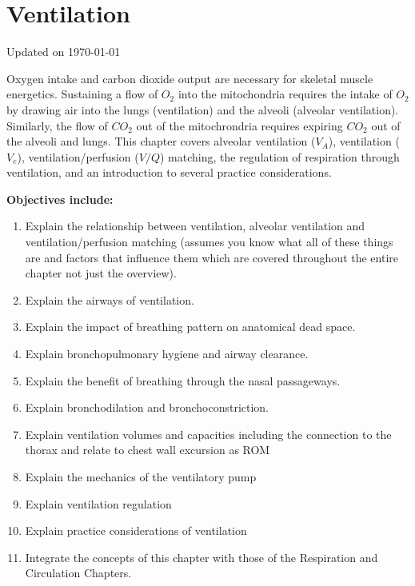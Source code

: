 \chapter{Ventilation}\label{chp:ventilation}
Updated on \today
\minitoc

Oxygen intake and carbon dioxide output are necessary for skeletal muscle energetics. Sustaining a flow of $O_2$ into the mitochondria requires the intake of $O_2$ by drawing air into the lungs (ventilation) and the alveoli (alveolar ventilation). Similarly, the flow of $CO_2$ out of the mitochrondria requires expiring $CO_2$ out of the alveoli and lungs. This chapter covers alveolar ventilation ($V_A$), ventilation ($V_e$), ventilation/perfusion ($V/Q$) matching, the regulation of respiration through ventilation, and an introduction to several practice considerations.

\vspace{5mm}
\begin{svgraybox}
\textbf{Objectives include:}
\begin{enumerate}
    \item Explain the relationship between ventilation, alveolar ventilation and ventilation/perfusion matching (assumes you know what all of these things are and factors that influence them which are covered throughout the entire chapter not just the overview).
    \item Explain the airways of ventilation.
    \item Explain the impact of breathing pattern on anatomical dead space.
    \item Explain bronchopulmonary hygiene and airway clearance.
    \item Explain the benefit of breathing through the nasal passageways.
    \item Explain bronchodilation and bronchoconstriction.
    \item Explain ventilation volumes and capacities including the connection to the thorax and relate to chest wall excursion as ROM
    \item Explain the mechanics of the ventilatory pump
    \item Explain ventilation regulation
    \item Explain practice considerations of ventilation
    \item Integrate the concepts of this chapter with those of the Respiration and Circulation Chapters.
\end{enumerate}
\end{svgraybox}

